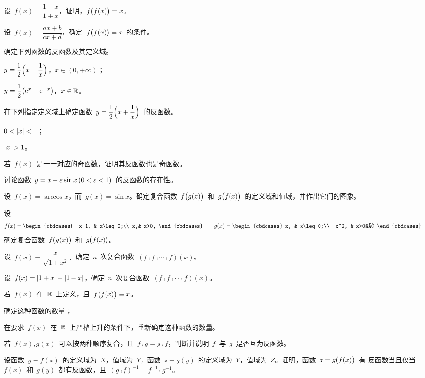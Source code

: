 \begin{exercise}
\item 设~$f(x)=\dfrac{1-x}{1+x}$，证明，$f\Parenb{f(x)}=x$。
\item 设~$f(x)=\dfrac{ax+b}{cx+d}$，确定~$f\Parenb{f(x)}=x$~的条件。
\item 确定下列函数的反函数及其定义域。
\begin{exlistcols}
  \item $\dps y=\frac12\Paren[\Big]{x-\frac 1x}$，\enspace$x\in(0,+\infty)$；
  \item $y=\dfrac12\Parenb{\me^x-\me^{-x}}$，\enspace$x\in\FR$。
\end{exlistcols}
\item 在下列指定定义域上确定函数~$\dps y=\frac12\Paren[\Big]{x+\frac1x}$~的反函数。
\begin{exlistcols}
  \item $0<\abs x<1$；
  \item $\abs x>1$。
\end{exlistcols}
\item 若~$f(x)$~是一一对应的奇函数，证明其反函数也是奇函数。
\item 讨论函数~$y=x-\e\sin x\,(0<\e<1)$~的反函数的存在性。
\item 设~$f(x)=\arccos x$，而~$g(x)=\sin x$。确定复合函数~$f\Parenb{g(x)}$~和~$g\Parenb{f(x)}$~的定义域和值域，并作出它们的图象。
\item 设
\[
  f(x)=\begin{cbdcases}
    -x-1, & x\leq0;\\
    x,& x>0,
  \end{cbdcases}\qquad
  g(x)=\begin{cbdcases}
    x,    & x\leq0;\\
    -x^2, & x>0。
  \end{cbdcases}
\]
确定复合函数~$f\Parenb{g(x)}$~和~$g\Parenb{f(x)}$。
\item 设~$f(x)=\dfrac x{\sqrt{1+x^2}}$，确定~$n$~次复合函数~$(f\comp f\comp\dotsb\comp f)(x)$。
\item 设~$f(x)=\abs{1+x}-\abs{1-x}$，确定~$n$~次复合函数~$(f\comp f\comp\dotsb\comp f)(x)$。
\item 若~$f(x)$~在~$\FR$~上定义，且~$f\Parenb{f(x)}\equiv x$。
\begin{exlistcols}
  \item 确定这种函数的数量；
  \item 在要求~$f(x)$~在~$\FR$~上严格上升的条件下，重新确定这种函数的数量。
\end{exlistcols}
\item 若~$f(x),g(x)$~可以按两种顺序复合，且~$f\comp g=g\comp f$，判断并说明~$f$~与~$g$~是否互为反函数。
\item 设函数~$y=f(x)$~的定义域为~$X$，值域为~$Y$，函数~$z=g(y)$~的定义域为~$Y$，值域为~$Z$。证明，函数~$z=g\Parenb{f(x)}$~有
反函数当且仅当~$f(x)$~和~$g(y)$~都有反函数，且~$(g\comp f)^{-1}=f^{-1}\comp g^{-1}$。
\end{exercise}


